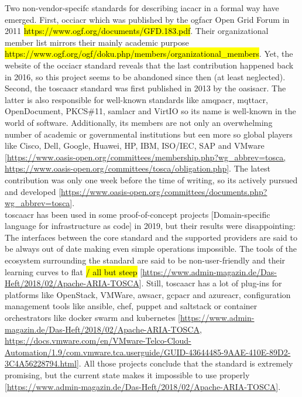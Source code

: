 Two non-vendor-specifc standards for describing \gls{iacacr} in a formal way have emerged. First, \gls{occiacr} which was published by the \gls{ogfacr} Open Grid Forum in 2011 \hl{https://www.ogf.org/documents/GFD.183.pdf}. Their organizational member list mirrors their mainly academic purpose \hl{https://www.ogf.org/ogf/doku.php/members/organizational\_members}. Yet, the website of the \gls{occiacr} standard reveals that the last contribution happened back in 2016, so this project seems to be abandoned since then (at least neglected).
\\
Second, the \gls{toscaacr} standard was first published in 2013 by the \gls{oasisacr}. The latter is also responsible for well-known standards like \gls{amqpacr}, \gls{mqttacr}, OpenDocument, PKCS\#11, \gls{samlacr} and VirtIO so its name is well-known in the world of software. Additionally, its members are not only an overwhelming number of academic or governmental institutions but een more so global players like Cisco, Dell, Google, Huawei, HP, IBM, ISO/IEC, SAP and VMware [\url{https://www.oasis-open.org/committees/membership.php?wg\_abbrev=tosca, https://www.oasis-open.org/committees/tosca/obligation.php}]. The latest contribution was only one week before the time of writing, so its actively pursued and developed [\url{https://www.oasis-open.org/committees/documents.php?wg\_abbrev=tosca}].
\\
\gls{toscaacr} has been used in some proof-of-concept projects [Domain-specific language for infrastructure as code] in 2019, but their results were disappointing: The interfaces between the core standard and the supported providers are said to be always out of date making even simple operations impossible. The tools of the ecosystem surrounding the standard are said to be non-user-friendly and their learning curves to flat \hl{/ all but steep} [\url{https://www.admin-magazin.de/Das-Heft/2018/02/Apache-ARIA-TOSCA}].
Still, \gls{toscaacr} has a lot of plug-ins for platforms like OpenStack, VMWare, \gls{awsacr}, \gls{gcpacr} and \gls{azureacr}, configuration management tools like ansible, chef, puppet and saltstack or container orchestrators like docker swarm and kubernetes [\url{https://www.admin-magazin.de/Das-Heft/2018/02/Apache-ARIA-TOSCA}, \url{https://docs.vmware.com/en/VMware-Telco-Cloud-Automation/1.9/com.vmware.tca.userguide/GUID-43644485-9AAE-410E-89D2-3C4A56228794.html}].
All those projects conclude that the standard is extremely promising, but the current state makes it impossible to use properly [\url{https://www.admin-magazin.de/Das-Heft/2018/02/Apache-ARIA-TOSCA}].
